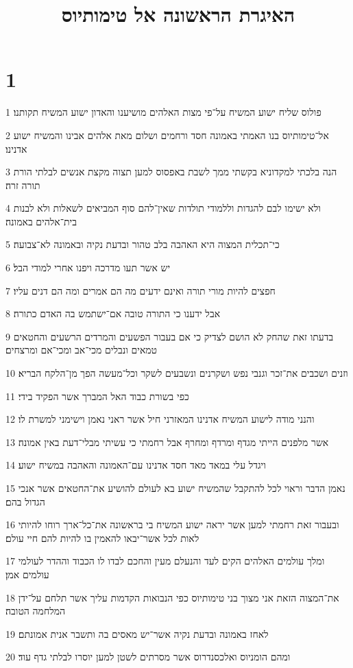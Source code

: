 

\title{האיגרת הראשונה אל טימותיוס}


\chapter{1}

\par 1 פולוס שליח ישוע המשיח על־פי מצות האלהים מושיענו והאדון ישוע המשיח תקותנו׃
\par 2 אל־טימותיוס בנו האמתי באמונה חסד ורחמים ושלום מאת אלהים אבינו והמשיח ישוע אדנינו׃
\par 3 הנה בלכתי למקדוניא בקשתי ממך לשבת באפסוס למען תצוה מקצת אנשים לבלתי הורת תורה זרה׃
\par 4 ולא ישימו לבם להגדות וללמודי תולדות שאין־להם סוף המביאים לשאלות ולא לבנות בית־אלהים באמונה׃
\par 5 כי־תכלית המצוה היא האהבה בלב טהור ובדעת נקיה ובאמונה לא־צבועה׃
\par 6 יש אשר תעו מדרכה ויפנו אחרי למודי הבל׃
\par 7 חפצים להיות מורי תורה ואינם ידעים מה הם אמרים ומה הם דנים עליו׃
\par 8 אבל ידענו כי התורה טובה אם־ישתמש בה האדם כתורה׃
\par 9 בדעתו זאת שהחק לא הושם לצדיק כי אם בעבור הפשעים והמרדים הרשעים והחטאים טמאים ונבלים מכי־אב ומכי־אם ומרצחים׃
\par 10 וזנים ושכבים את־זכר וגנבי נפש ושקרנים ונשבעים לשקר וכל־מעשה הפך מן־הלקח הבריא׃
\par 11 כפי בשורת כבוד האל המברך אשר הפקיד בידי׃
\par 12 והנני מודה לישוע המשיח אדנינו המאזרני חיל אשר ראני נאמן וישימני למשרת לו׃
\par 13 אשר מלפנים הייתי מגדף ומרדף ומחרף אבל רחמתי כי עשיתי מבלי־דעת באין אמונה׃
\par 14 ויגדל עלי במאד מאד חסד אדנינו עם־האמונה והאהבה במשיח ישוע׃
\par 15 נאמן הדבר וראוי לכל להתקבל שהמשיח ישוע בא לעולם להושיע את־החטאים אשר אנכי הגדול בהם׃
\par 16 ובעבור זאת רחמתי למען אשר יראה ישוע המשיח בי בראשונה את־כל־ארך רוחו להיותי לאות לכל אשר־יבאו להאמין בו להיות להם חיי עולם׃
\par 17 ומלך עולמים האלהים הקים לעד והנעלם מעין והחכם לבדו לו הכבוד וההדר לעולמי עולמים אמן׃
\par 18 את־המצוה הזאת אני מצוך בני טימותיוס כפי הנבואות הקדמות עליך אשר תלחם על־ידן המלחמה הטובה׃
\par 19 לאחז באמונה ובדעת נקיה אשר־יש מאסים בה ותשבר אנית אמונתם׃
\par 20 ומהם הומניוס ואלכסנדרוס אשר מסרתים לשטן למען יוסרו לבלתי גדף עוד׃

